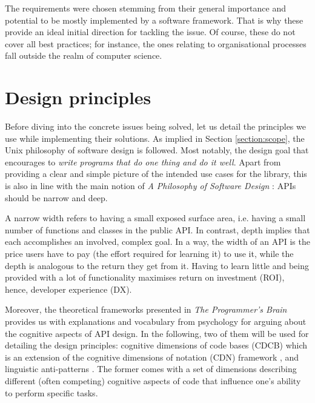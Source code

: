 The requirements were chosen stemming from their general importance and potential to be mostly implemented by a software framework. That is why these provide an ideal initial direction for tackling the issue. Of course, these do not cover all best practices; for instance, the ones relating to organisational processes fall outside the realm of computer science.

\section{Design principles} \label{section:principles}

Before diving into the concrete issues being solved, let us detail the principles we use while implementing their solutions. As implied in Section \ref{section:scope}, the Unix philosophy \cite{ritchie1978unix,salus1994quarter} of software design is followed. Most notably, the design goal that encourages to \textit{write programs that do one thing and do it well}. Apart from providing a clear and simple picture of the intended use cases for the library, this is also in line with the main notion of \textit{A Philosophy of Software Design} \cite{ousterhout2018philosophy}: APIs should be narrow and deep. 

A narrow width refers to having a small exposed surface area, i.e. having a small number of functions and classes in the public API. In contrast, depth implies that each accomplishes an involved, complex goal. In a way, the width of an API is the price users have to pay (the effort required for learning it) to use it, while the depth is analogous to the return they get from it. Having to learn little and being provided with a lot of functionality maximises return on investment (ROI), hence, developer experience (DX). 

Moreover, the theoretical frameworks presented in \textit{The Programmer's Brain} \cite{hermans2021programmer} provides us with explanations and vocabulary from psychology for arguing about the cognitive aspects of API design. In the following, two of them will be used for detailing the design principles: cognitive dimensions of code bases (CDCB) which is an extension of the cognitive dimensions of notation (CDN) framework \cite{blackwell2001cognitive}, and linguistic anti-patterns \cite{arnaoudova2016linguistic}. The former comes with a set of dimensions describing different (often competing) cognitive aspects of code that influence one's ability to perform specific tasks.

